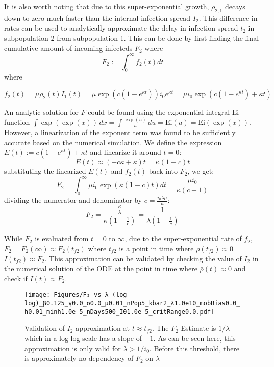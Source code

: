 \documentclass{article}
\begin{document}
It is also worth noting that due to this super-exponential growth, $\rho_{2,1}$ decays down to zero much faster than the internal infection spread $I_2$. This difference in rates can be used to analytically approximate the delay in infection spread $t_2$ in subpopulation 2 from subpopulation 1. This can be done by first finding the final cumulative amount of incoming infecteds $F_2$ where 
\begin{equation}F_2:=\int_0^\infty f_2(t)dt\end{equation}
where 

\begin{equation}f_2(t)=\mu \bar \rho_2(t) I_1(t) = \mu \exp\left({c \left( 1 - e^{\kappa t} \right)}\right)i_0 e^{\kappa t} = \mu i_0 \exp\left({c \left( 1 - e^{\kappa t} \right)} +\kappa t\right)\end{equation}

An analytic solution for $F$ could be found using the exponential integral $\mathrm{Ei}$ function  $\int\exp(\exp(x))\,d x=\int{\frac{\exp(u)}{u}}\,d u={\mathrm{Ei}}(u)={\mathrm{Ei}}(\exp(x))$. However, a linearization of the exponent term was found to be sufficiently accurate based on the numerical simulation. We define the expression $E(t):=c\left( 1 - e^{\kappa t} \right)+\kappa t$ and linearize it around $t=0$: 
\begin{equation}E(t)\approx (-c\kappa+\kappa)t = \kappa (1-c) t\end{equation}
substituting the linearized $E(t)$ and $f_2(t)$ back into $F_2$, we get:
\begin{equation}F_2=\int_0^\infty \mu i_0 \exp\left(\kappa (1-c) t \right) dt = \frac{\mu i_0}{\kappa(c-1)}\end{equation}
dividing the numerator and denominator by $c=\frac{i_{0} \lambda \mu}{\kappa}$:
\begin{equation}
F_2=\frac{\frac{\kappa}{\lambda}}{\kappa\left( 1-\frac{1}{c} \right)}=\frac{1}{\lambda\left( 1-\frac{1}{c} \right)}
\end{equation}

While $F_2$ is evaluated from $t=0$ to $\infty$, due to the super-exponential rate of $f_2$, $F_2=F_2(\infty)\approx F_2(t_{f2})$ where $t_{f2}$ is a point in time where $\bar\rho(t_{f2})\approx 0$  $I({t_{f2}})\approx F_2$. This approximation can be validated by checking the value of $I_2$ in the numerical solution of the ODE at the point in time where $\bar\rho(t)\approx 0$ and check if $I(t)\approx F_2$. 

\begin{figure}[!ht]
    \centering
    \texttt{[image: Figures/F₂ vs λ (log-log)\_β0.125\_γ0.0\_σ0.0\_μ0.01\_nPop5\_kbar2\_λ1.0e10\_mobBias0.0\_h0.01\_minh1.0e-5\_nDays500\_I01.0e-5\_critRange0.0.pdf]}
    \caption{\small Validation of $I_2$ approximation at $t \approx t_{f2}$. The $F_2$ Estimate is $1/\lambda$ which in a log-log scale has a slope of $-1$. As can be seen here, this approximation is only valid for $\lambda>1/i_0$. Before this threshold, there is approximately no dependency of $F_2$ on $\lambda$ }

\end{figure}
\end{document}
